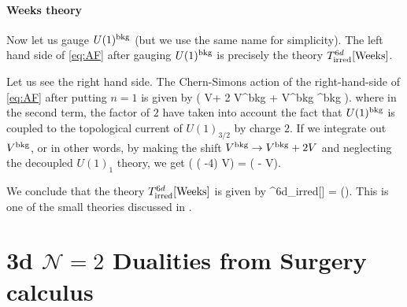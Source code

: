 \documentclass[a4paper,11pt]{article}
\def\cN{\mathcal{N}}
\def\beq#1\eeq{\begin{align}#1\end{align}}
\begin{document}
\paragraph{Weeks theory}
Now let us gauge $U(1)^{\rm bkg}$ (but we use the same name for simplicity). 
The left hand side of \eqref{eq:AF} after gauging  $U(1)^{\rm bkg}$ is precisely the theory $T^{6d}_{\rm irred}[\text{Weeks}]$.

Let us see the right hand side.
The Chern-Simons action of the right-hand-side of \eqref{eq:AF} after putting $n=1$ is given by
\beq
\frac{1}{4\pi } \left(  V\Sigma + 2    V\Sigma^{\rm bkg} + V^{\rm bkg} \Sigma^{\rm bkg}   \right).
\eeq
where in the second term, the factor of $2$ have taken into account the fact that $U(1)^{\rm bkg}$ is coupled to the topological current of $U(1)_{3/2}$ by charge $2$.
If we integrate out $V^{\rm bkg}$, or in other words, by making the shift $V^{\rm bkg}  \to V^{\rm bkg}  + 2V$ and neglecting the decoupled $U(1)_{1}$ theory,
we get
\beq
\frac{1}{4\pi } \left( (  -4) V\Sigma   \right) = \left( -   V\Sigma   \right).
\eeq

We conclude that the theory $T^{6d}_{\rm irred}[\text{Weeks}]$ is given by
\beq
T^{6d}_{\rm irred}[] = ().
\eeq
This is one of the small theories discussed in \cite{Gang:2017lsr}.






\section{3d $\cN=2$ Dualities from Surgery calculus} \label{sec: Duality/Surgery}
\end{document}
